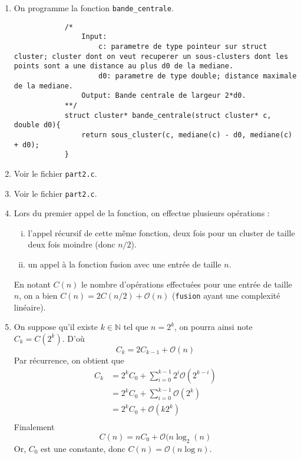 \documentclass[10pt]{article}
\newcommand{\f}[1]{\texttt{#1}}
\def\N{\mathbb N}
\begin{document}
\begin{enumerate}[start=4,label={\bfseries Question \arabic*}]
		\item On programme la fonction \f{bande\_centrale}.
		\begin{lstlisting}
			/*
				Input:	
					c: parametre de type pointeur sur struct cluster; cluster dont on veut recuperer un sous-clusters dont les points sont a une distance au plus d0 de la mediane.
					d0: parametre de type double; distance maximale de la mediane.
				Output: Bande centrale de largeur 2*d0.
			**/
			struct cluster* bande_centrale(struct cluster* c, double d0){
				return sous_cluster(c, mediane(c) - d0, mediane(c) + d0);
			}
		\end{lstlisting}
		\item Voir le fichier \f{part2.c}.
		\item Voir le fichier \f{part2.c}.
		\item Lors du premier appel de la fonction, on effectue plusieurs opérations : 
		\begin{enumerate}[i)]
			\item l'appel récursif de cette même fonction, deux fois pour un cluster de taille deux fois moindre (donc $n/2$).
			\item un appel à la fonction fusion avec une entrée de taille $n$.
		\end{enumerate}
		En notant $C(n)$ le nombre d'opérations effectuées pour une entrée de taille $n$, on a bien $C(n)=2C(n/2)+\mathcal{O}(n)$ (\f{fusion} ayant une complexité linéaire).
		\item On suppose qu'il existe $k\in\N$ tel que $n=2^k$, on pourra ainsi note $C_k=C(2^k)$. D'où \[C_k=2C_{k-1}+\mathcal{O}(n)\]
		Par récurrence, on obtient que 
		\begin{align*}
			C_k &= 2^kC_0+\sum_{i=0}^{k-1}2^i\mathcal{O}(2^{k-i})\\
				&= 2^kC_0+\sum_{i=0}^{k-1}\mathcal{O}(2^k)\\
				&= 2^kC_0+\mathcal{O}(k2^k)\\
		\end{align*}
		Finalement \[C(n)=nC_0+\mathcal{O}(n\log_2(n)\]
		Or, $C_0$ est une constante, donc $C(n)=\mathcal{O}(n\log n)$.
	\end{enumerate}
\end{document}
